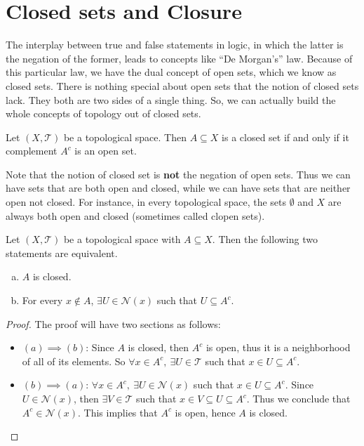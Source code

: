 \section{Closed sets and Closure}
The interplay between true and false statements in logic, in which the latter is the negation of the former, leads to concepts like ``De Morgan's'' law. Because of this particular law, we have the dual concept of open sets, which we know as closed sets. There is nothing special about open sets that the notion of closed sets lack. They both are two sides of a single thing. So, we can actually build the whole concepts of topology out of closed sets.

\begin{definition}
	Let $(X,\mathcal{T})$ be a topological space. Then $A \subseteq X$ is a closed set if and only if it complement $A^c$ is an open set. 
\end{definition}

Note that the notion of closed set is \textbf{not} the negation of open sets. Thus we can have sets that are both open and closed, while we can have sets that are neither open not closed. For instance, in every topological space, the sets $\emptyset$ and $X$ are always both open and closed (sometimes called clopen sets).

\begin{lemma}{}
	Let $(X,\mathcal{T})$ be a topological space with $A \subseteq X$. Then the following two statements are equivalent.
	\begin{enumerate}[(a)]
		\item $A$ is closed.
		\item For every $x \notin A$, $\exists U \in \mathcal{N}(x)$ such that $U \subseteq A^c$.
	\end{enumerate}
\end{lemma}
\begin{proof}
	The proof will have two sections as follows:
	\begin{itemize}
		\item $(a) \implies (b)$: Since $A$ is closed, then $A^c$ is open, thus it is a neighborhood of all of its elements. So $\forall x\in A^c,\ \exists U \in \mathcal{T}$ such that $x \in U \subseteq A^c$.
		\item $(b) \implies (a)$: $\forall x \in A^c,\ \exists U \in \mathcal{N}(x)$ such that $x\in U \subseteq A^c$. Since $U \in \mathcal{N}(x)$, then $\exists V \in \mathcal{T}$ such that $x\in V \subseteq U \subseteq A^c$. Thus we conclude that $A^c \in \mathcal{N}(x)$. This implies that $A^c$ is open, hence $A$ is closed. 
	\end{itemize}
\end{proof}

